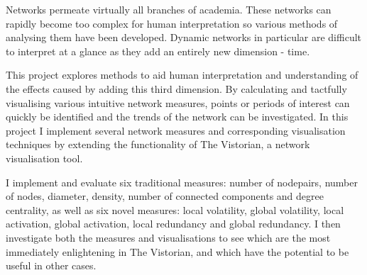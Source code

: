 

\begin{abstracts}

Networks permeate virtually all branches of academia. These networks can rapidly become too complex for human interpretation so various methods of analysing them have been developed. Dynamic networks in particular are difficult to interpret at a glance as they add an entirely new dimension - time.

This project explores methods to aid human interpretation and understanding of the effects caused by adding this third dimension. By calculating and tactfully visualising various intuitive network measures, points or periods of interest can quickly be identified and the trends of the network can be investigated. In this project I implement several network measures and corresponding visualisation techniques by extending the functionality of The Vistorian, a network visualisation tool.

I implement and evaluate six traditional measures: number of nodepairs, number of nodes, diameter, density, number of connected components and degree centrality, as well as six novel measures: local volatility, global volatility, local activation, global activation, local redundancy and global redundancy. I then investigate both the measures and visualisations to see which are the most immediately enlightening in The Vistorian, and which have the potential to be useful in other cases.
\end{abstracts}
